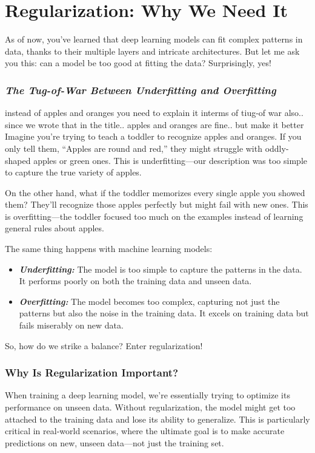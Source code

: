 \section{Regularization: Why We Need It}
As of now, you’ve learned that deep learning models can fit complex patterns in data, thanks to their multiple layers and intricate architectures. But let me ask you this: can a model be too good at fitting the data? Surprisingly, yes!

\subsubsection{\textit{The Tug-of-War Between Underfitting and Overfitting}}
instead of apples and oranges you need to explain it interms of tiug-of war also.. since we wrote that in the title.. apples and oranges are fine.. but make it better
Imagine you’re trying to teach a toddler to recognize apples and oranges. If you only tell them, “Apples are round and red,” they might struggle with oddly-shaped apples or green ones. This is underfitting—our description was too simple to capture the true variety of apples.

On the other hand, what if the toddler memorizes every single apple you showed them? They’ll recognize those apples perfectly but might fail with new ones. This is overfitting—the toddler focused too much on the examples instead of learning general rules about apples.

The same thing happens with machine learning models:

\begin{itemize}
    \item \textit{\textbf{Underfitting:}} The model is too simple to capture the patterns in the data. It performs poorly on both the training data and unseen data.
    \item \textbf{\textit{Overfitting:}} The model becomes too complex, capturing not just the patterns but also the noise in the training data. It excels on training data but fails miserably on new data.
    
\end{itemize}
So, how do we strike a balance? Enter regularization!
\subsubsection{Why Is Regularization Important?}
When training a deep learning model, we’re essentially trying to optimize its performance on unseen data. Without regularization, the model might get too attached to the training data and lose its ability to generalize. This is particularly critical in real-world scenarios, where the ultimate goal is to make accurate predictions on new, unseen data—not just the training set.

